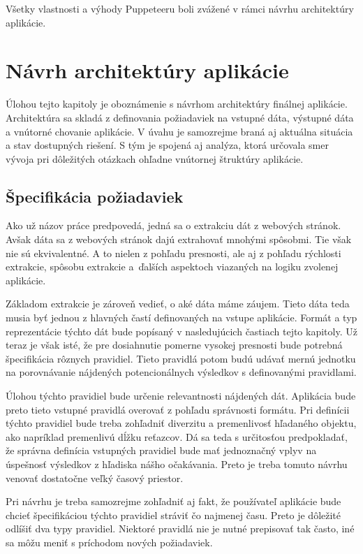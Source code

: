 Všetky vlastnosti a výhody Puppeteeru boli zvážené v rámci návrhu architektúry aplikácie.

\chapter{Návrh architektúry aplikácie}
\label{Navrh}
Úlohou tejto kapitoly je oboznámenie s návrhom architektúry finálnej aplikácie. Architektúra sa skladá z definovania požiadaviek na vstupné dáta, výstupné dáta a vnútorné chovanie aplikácie. V úvahu je samozrejme braná aj aktuálna situácia a stav dostupných riešení.  S tým je spojená aj analýza, ktorá určovala smer vývoja pri dôležitých otázkach ohľadne vnútornej štruktúry aplikácie.

\section{Špecifikácia požiadaviek}

Ako už názov práce predpovedá, jedná sa o extrakciu dát z webových stránok. Avšak dáta sa z webových stránok dajú extrahovať mnohými spôsobmi. Tie však nie sú ekvivalentné. A to nielen z pohľadu presnosti, ale aj z pohľadu rýchlosti extrakcie, spôsobu extrakcie a~ďalších aspektoch viazaných na logiku zvolenej aplikácie.

Základom extrakcie je zároveň vedieť, o aké dáta máme záujem. Tieto dáta teda musia byť jednou z hlavných častí definovaných na vstupe aplikácie. Formát a typ reprezentácie týchto dát bude popísaný v nasledujúcich častiach tejto kapitoly. Už teraz je však isté, že pre dosiahnutie pomerne vysokej presnosti bude potrebná špecifikácia rôznych pravidiel. Tieto pravidlá potom budú udávať mernú jednotku na porovnávanie nájdených potencionálnych výsledkov s definovanými pravidlami.

Úlohou týchto pravidiel bude určenie relevantnosti nájdených dát. Aplikácia bude preto tieto vstupné pravidlá overovať z pohľadu správnosti formátu. Pri definícii týchto pravidiel bude treba zohľadniť diverzitu a premenlivosť hľadaného objektu, ako napríklad premenlivú dĺžku reťazcov. Dá sa teda s určitosťou predpokladať, že správna definícia vstupných pravidiel bude mať jednoznačný vplyv na úspešnosť výsledkov z hľadiska nášho očakávania. Preto je treba tomuto návrhu venovať dostatočne veľký časový priestor.

Pri návrhu je treba samozrejme zohľadniť aj fakt, že používateľ aplikácie bude chcieť špecifikáciou týchto pravidiel stráviť čo najmenej času. Preto je dôležité odlíšiť dva typy pravidiel. Niektoré pravidlá nie je nutné prepisovať tak často, iné sa môžu meniť s príchodom nových požiadaviek.

